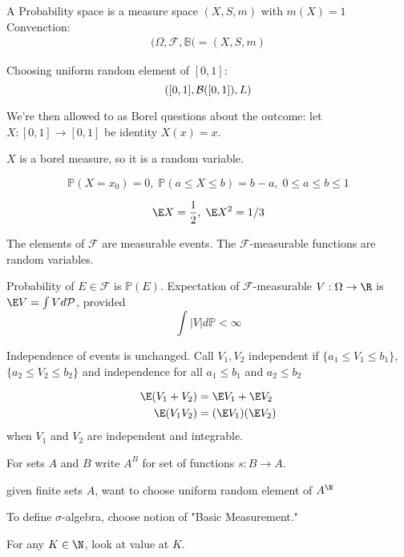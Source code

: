 \begin{definition}
	A Probability space is a measure space $(X,S, m)$ with $m(X)=1$
	Convenction:
	\begin{align*}
		(\Omega, \mathcal{F}, \mathbb{B}( = (X,S, m)
	\end{align*} 
\end{definition}

\begin{example}
	Choosing uniform random element of $[0,1]$:
	 \[
		 ([0,1], \mathcal{B}([0,1]), L)
	\] 
\end{example}

We're then allowed to as Borel questions about the outcome:
let
$X : [0,1] \to [0,1]$ be identity $X(x) = x$.

$X$ is a borel measure, so it is a random variable.

 \[
	\mathbb{P}(X = x_0) =0, \; \mathbb{P}(a \leq X \leq b) = b-a, \; 0 \leq a \leq b \leq 1
\]

\[
	\E X = \frac{1}{2}, \; \E X^2 = 1/3
\] 

The elements of $\mathcal{F}$ are measurable events. The $\mathcal{F}$-measurable functions are random variables.

Probability of $E \in \mathcal{F}$ is $\mathbb{P}(E)$. Expectation of $\mathcal{F}$-measurable $V : \Omega \to \R$ is $\E V = \int V d \mathcal{P}$, provided
\[
	\int |V| d \mathbb{P} < \infty
\] 

Independence of events is unchanged. Call $V_1, V_2$ independent if $\{ a_1 \leq V_1 \leq b_1 \}$,
$\{ a_2 \leq V_2 \leq b_2 \}$ and independence for all  $a_1 \leq b_1$ and $a_2 \leq b_2$


\begin{align*}
	\E ( V_1 + V_2 ) &= \E V_1 + \E V_2 \\
	\E (V_1 V_2 ) &= ( \E V_1 ) (\E V_2)
\end{align*} when $V_1$ and $V_2$ are independent and integrable.

\begin{definition}
	For sets $A$ and $B$ write $A^B$ for set of functions $s : B \to A$.
\end{definition}

given finite sets $A$, want to choose uniform random element of $A^{\N}$
 

To define $\sigma$-algebra, choose notion of "Basic Measurement."

For any $K \in \N$, look at value at $K.$


